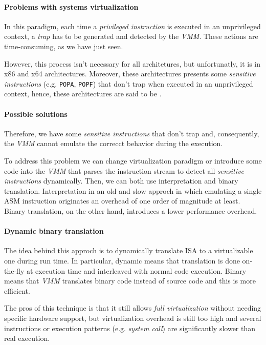\paragraph{Problems with systems virtualization}
In this paradigm, each time a \emph{privileged instruction} is executed in an
unprivileged context, a \emph{trap} has to be generated and detected by the
\emph{VMM}. These actions are time-consuming, as we have just seen.

However, this process isn't necessary for all architetures, but unfortunatly,
it is in x86 and x64 architectures. Moreover, these architectures presents
some \emph{sensitive instructions} (e.g. \texttt{POPA}, \texttt{POPF}) that
don't trap when executed in an unprivileged context, hence, these architectures
are said to be .

\paragraph{Possible solutions}
Therefore, we have some \emph{sensitive instructions} that don't trap and,
consequently, the \emph{VMM} cannot emulate the correcct behavior during the
execution.

To address this problem we can change virtualization paradigm or introduce
some code into the \emph{VMM} that parses the instruction stream to detect
all \emph{sensitive instructions} dynamically. Then, we can both use
interpretation and binary translation. Interpretation in an old and slow approch
in which emulating a single ASM instruction originates an overhead of one order
of magnitude at least. Binary translation, on the other hand, introduces a
lower performance overhead.

\paragraph{Dynamic binary translation}
The idea behind this approch is to dynamically translate 
ISA to a virtualizable one during run time. In particular, dynamic means that
translation is done on-the-fly at execution time and interleaved with normal
code execution. Binary means that \emph{VMM} translates binary code instead of
source code and this is more efficient.

The pros of this technique is that it still allows \emph{full virtualization}
without needing specific hardware support, but virtualization overhead is still
too high and several instructions or execution patterns (e.g. \emph{system call})
are significantly slower than real execution.

